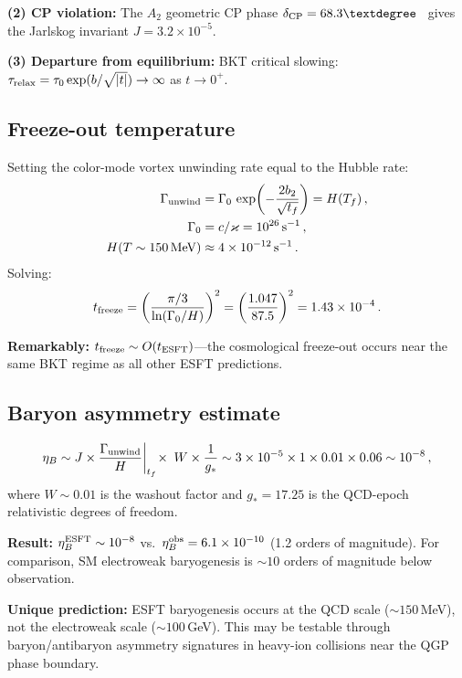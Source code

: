 \documentclass[twocolumn,preprintnumbers,amsmath,amssymb,prd]{revtex4-2}
\begin{document}
\textbf{(2) CP violation:}
The $A_2$ geometric CP phase $\delta_{\rm CP} = 68.3°$~\cite{Paper9} gives the Jarlskog invariant $J = 3.2\times10^{-5}$.

\textbf{(3) Departure from equilibrium:}
BKT critical slowing: $\tau_{\rm relax} = \tau_0\exp(b/\sqrt{|t|}) \to \infty$ as $t \to 0^+$.

\subsection{Freeze-out temperature}

Setting the color-mode vortex unwinding rate equal to the Hubble rate:
\begin{align}
\Gamma_{\rm unwind} &= \Gamma_0\,\exp\!\left(-\frac{2b_2}{\sqrt{t_f}}\right) = H(T_f)\,,\\
\Gamma_0 &= c/\varkappa = 10^{26}\,\text{s}^{-1}\,,\\
H(T \sim 150\,\text{MeV}) &\approx 4\times10^{-12}\,\text{s}^{-1}\,.
\end{align}
Solving:
\begin{equation}
t_{\rm freeze} = \left(\frac{\pi/3}{\ln(\Gamma_0/H)}\right)^2 = \left(\frac{1.047}{87.5}\right)^2 = 1.43\times10^{-4}\,.
\end{equation}

\textbf{Remarkably:} $t_{\rm freeze} \sim O(t_{\rm ESFT})$---the cosmological freeze-out occurs near the same BKT regime as all other ESFT predictions.

\subsection{Baryon asymmetry estimate}

\begin{equation}
\eta_B \sim J \times \frac{\Gamma_{\rm unwind}}{H}\bigg|_{t_f}\!\times\; W \times \frac{1}{g_*} \sim 3\times10^{-5}\times 1\times 0.01\times 0.06 \sim 10^{-8}\,,
\end{equation}
where $W \sim 0.01$ is the washout factor and $g_* = 17.25$ is the QCD-epoch relativistic degrees of freedom.

\textbf{Result:} $\eta_B^{\rm ESFT} \sim 10^{-8}$ vs.\ $\eta_B^{\rm obs} = 6.1\times10^{-10}$ (1.2 orders of magnitude).
For comparison, SM electroweak baryogenesis is $\sim 10$ orders of magnitude below observation.

\textbf{Unique prediction:} ESFT baryogenesis occurs at the QCD scale ($\sim 150\,$MeV), not the electroweak scale ($\sim 100\,$GeV).
This may be testable through baryon/antibaryon asymmetry signatures in heavy-ion collisions near the QGP phase boundary.
\end{document}
